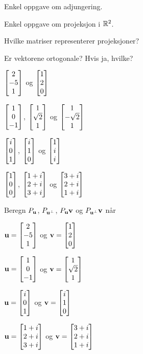 
\begin{oppgave}
Enkel oppgave om adjungering.
\end{oppgave}

\begin{oppgave}
Enkel oppgave om projeksjon i $\R^2$.
\end{oppgave}

\begin{oppgave}
Hvilke matriser representerer projeksjoner?
\end{oppgave}

\begin{oppgave}
Er vektorene ortogonale? Hvis ja, hvilke?
\begin{punkt}
$\vvv{2}{-5}{1}$ og $\vvv{1}{2}{0}$ \\[4pt]
\end{punkt}

\begin{punkt}
$\vvv{1}{0}{-1}$, $\vvv{1}{\sqrt{2}}{1}$ og $\vvv{1}{-\sqrt{2}}{1}$ \\[4pt]
\end{punkt}

\begin{punkt}
$\vvv{i}{0}{1}$, $\vvv{i}{1}{0}$ og $\vvv{1}{i}{i}$ \\[4pt]
\end{punkt}

\begin{punkt}
$\vvv{1}{0}{0}$, $\vvv{1+i}{2+i}{3+i}$ og $\vvv{3+i}{2+i}{1+i}$ \\[4pt]
\end{punkt}
\end{oppgave}

\begin{oppgave}
Beregn $P_{\V u}$, $P_{\V u^{\perp}}$, $P_{\V u}\V v$ og $P_{\V u^{\perp}}\V v$ når \\[2pt]
\begin{punkt}
$\V{u}=\vvv{2}{-5}{1}$ og $\V{v}=\vvv{1}{2}{0}$\\[4pt]
\end{punkt}

\begin{punkt}
$\V{u}=\vvv{1}{0}{-1}$ og $\V{v}=\vvv{1}{\sqrt{2}}{1}$\\[4pt]
\end{punkt}

\begin{punkt}
$\V{u}=\vvv{i}{0}{1}$ og $\V{v}=\vvv{i}{1}{0}$\\[4pt]
\end{punkt}

\begin{punkt}
$\V{u}=\vvv{1+i}{2+i}{3+i}$ og $\V{v}=\vvv{3+i}{2+i}{1+i}$
\end{punkt}
\end{oppgave}




